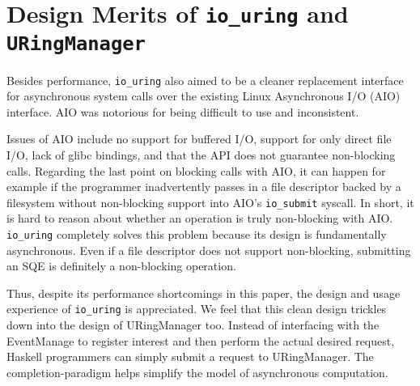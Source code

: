 \section{Design Merits of \texttt{io\_uring} and \texttt{URingManager}}
Besides performance, \texttt{io\_uring} also aimed to be a cleaner replacement interface for asynchronous system calls over the existing Linux Asynchronous I/O (AIO) interface. AIO was notorious for being difficult to use and inconsistent.

Issues of AIO include no support for buffered I/O, support for only direct file I/O, lack of glibc bindings, and that the API does not guarantee non-blocking calls.
Regarding the last point on blocking calls with AIO, it can happen for example if the programmer inadvertently passes in a file descriptor backed by a filesystem without non-blocking support into AIO’s \texttt{io\_submit} syscall. In short, it is hard to reason about whether an operation is truly non-blocking with AIO. \texttt{io\_uring} completely solves this problem because its design is fundamentally asynchronous. Even if a file descriptor does not support non-blocking, submitting an SQE is definitely a non-blocking operation.



Thus, despite its performance shortcomings in this paper, the design and usage experience of \texttt{io\_uring} is appreciated. We feel that this clean design trickles down into the design of URingManager too. Instead of interfacing with the EventManage to register interest and then perform the actual desired request, Haskell programmers can simply submit a request to URingManager. The completion-paradigm helps simplify the model of asynchronous computation.

